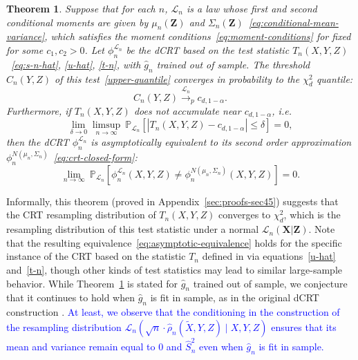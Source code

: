 \documentclass[ejs]{imsart}
\numberwithin{equation}{section}
\theoremstyle{plain}
\newtheorem{theorem}{Theorem}[section]
\theoremstyle{definition}
\theoremstyle{remark}
\newcommand{\prx}{\bm X}
\newcommand{\srx}{X}
\newcommand{\prz}{\bm Z}
\newcommand{\srz}{Z}
\newcommand{\srxk}{\widetilde X}
\newcommand{\sry}{Y}
\begin{document}
\begin{theorem} \label{thm:equivalence}
Suppose that for each $n$, $\mathcal L_n$ is a law whose first and second conditional moments are given by $\mu_n(\prz)$ and $\Sigma_n(\prz)$~\eqref{eq:conditional-mean-variance}, which satisfies the moment conditions~\eqref{eq:moment-conditions} for fixed for some $c_1, c_2 > 0$. Let $\phi_n^{\mathcal L_n}$ be the dCRT based on the test statistic $T_n(\srx, \sry, \srz)$~\eqref{eq:s-n-hat}, \eqref{u-hat}, \eqref{t-n}, with $\widehat g_n$ trained out of sample. The threshold $C_n(\sry, \srz)$ of this test~\eqref{upper-quantile} converges in probability to the $\chi^2_d$ quantile:
	\begin{equation}
		C_n(Y,Z) \overset{\mathcal L_n}\rightarrow_p c_{d,1-\alpha}.
		\label{eq:threshold-convergence}
	\end{equation}
	Furthermore, if $T_n(\srx, \sry, \srz)$ does not accumulate near $c_{d,1-\alpha}$, i.e.
	\begin{equation}
		\lim_{\delta \rightarrow 0}\limsup_{n \rightarrow \infty}\ \mathbb P_{\mathcal L_n}[|T_n(\srx, \sry, \srz)-c_{d,1-\alpha}| \leq \delta] = 0,
		\label{eq:non-accumulation}
	\end{equation}
	then the dCRT $\phi_n^{\mathcal L_n}$ is asymptotically equivalent to its second order approximation $\phi^{N(\mu_n, \Sigma_n)}_n$~\eqref{eq:crt-closed-form}:
	\begin{equation}
		\lim_{n \rightarrow \infty}\ \mathbb P_{\mathcal L_n}[\phi^{\mathcal L_n}_n(\srx, \sry, \srz) \neq \phi^{N(\mu_n, \Sigma_n)}_n(\srx, \sry, \srz)] = 0.
		\label{eq:asymptotic-equivalence}
	\end{equation}	
\end{theorem}

Informally, this theorem (proved in Appendix~\ref{sec:proofs-sec45}) suggests that the CRT resampling distribution of $T_n(\srx, \sry, \srz)$ converges to $\chi^2_d$, which is the resampling distribution of this test statistic under a normal $\mathcal L_n(\prx|\prz)$. Note that the resulting equivalence~\eqref{eq:asymptotic-equivalence} holds for the specific instance of the CRT based on the statistic $T_n$ defined in via equations~\eqref{u-hat} and~\eqref{t-n}, though other kinds of test statistics may lead to similar large-sample behavior. While Theorem~\ref{thm:equivalence} is stated for $\widehat g_n$ trained out of sample, we conjecture that it continues to hold when $\widehat g_n$ is fit in sample, as in the original dCRT construction \cite{Liu2020}. \textcolor{blue}{At least, we observe that the conditioning in the construction of the resampling distribution $\mathcal L_n(\sqrt n \cdot \widehat \rho_n(\srxk, \sry, \srz) \mid \srx, \sry, \srz)$ ensures that its mean and variance remain equal to $0$ and $\widehat S_n^2$ even when $\widehat g_n$ is fit in sample.}
\end{document}
